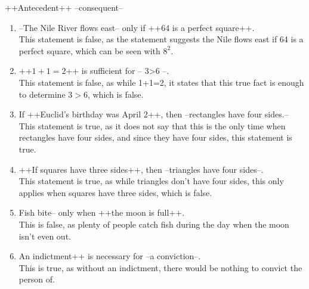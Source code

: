\documentclass{letter}
\begin{document}
\begin{description}
\begin{enumerate}
                  
                         ++Antecedent++  --consequent-- \\
                         \begin{enumerate}
			\item  --The Nile River flows east-- only if ++64 is a perfect square++. \\ 
                         This statement is false, as the statement suggests the Nile flows east if 64 is a perfect square, which can be seen with $8^2$. \\ 
			\item  ++$1+1=2$++ is sufficient for -- 3>6 --. \\ 
                         This statement is false, as while 1+1=2, it states that this true fact is enough to determine $3>6$, which is false. \\
			\item  If ++Euclid's birthday was April 2++, then --rectangles have four sides.-- \\
                         This statement is true, as it does not say that this is the only time when rectangles have four sides, and since they have four sides, this statement is true. \\
			\item  ++If squares have three sides++, then --triangles have four sides--. \\
                          This statement is true, as while triangles don't have four sides, this only applies when squares have three sides, which is false. \\
			\item Fish bite-- only when ++the moon is full++. \\
                          This is false, as plenty of people catch fish during the day when the moon isn't even out. \\
			\item An indictment++ is necessary for --a conviction--. \\
                          This is true, as without an indictment, there would be nothing to convict the person of. \\
	                  

\end{enumerate}
\end{enumerate}
\end{description}
\end{document}
